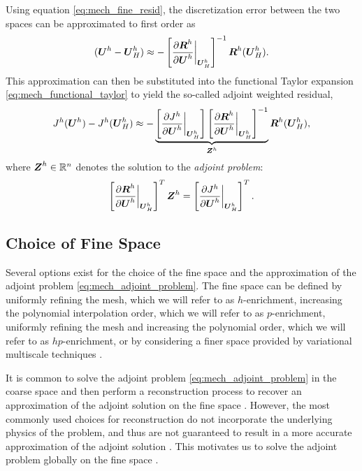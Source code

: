 Using equation \eqref{eq:mech_fine_resid}, the discretization error between
the two spaces can be approximated to first order as
%
\begin{gather}
(\boldsymbol{U}^h - \boldsymbol{U}^h_H) \approx
- \left[
\frac{ \partial \boldsymbol{R}^h } { \partial \boldsymbol{U}^h } \biggr|_{\boldsymbol{U}^h_H}
\right]^{-1}
\boldsymbol{R}^h (\boldsymbol{U}^h_H ).
\label{eq:mech_disc_error_approx}
\end{gather}
This approximation can then be substituted into the functional Taylor
expansion \eqref{eq:mech_functional_taylor} to yield the so-called
adjoint weighted residual,
%
\begin{gather}
J^h(\boldsymbol{U}^h) - J^h(\boldsymbol{U}^h_H) \approx
- 
\underbrace{
\left[
\frac{ \partial J^h } { \partial \boldsymbol{U}^h } \biggr|_{\boldsymbol{U}^h_H}
\right]
\left[
\frac{ \partial \boldsymbol{R}^h } { \partial \boldsymbol{U}^h } \biggr|_{\boldsymbol{U}^h_H}
\right]^{-1}
}_{\boldsymbol{Z}^h}
\boldsymbol{R}^h (\boldsymbol{U}^h_H),
\label{eq:mech_adjoint_weighted_residual}
\end{gather}
%
where $\boldsymbol{Z}^h \in \mathbb{R}^n$ denotes the solution to the
\emph{adjoint problem}:
%
\begin{gather}
\left[
\frac{ \partial \boldsymbol{R}^h } { \partial \boldsymbol{U}^h} \biggr|_{\boldsymbol{U}^h_H}
\right]^T
\boldsymbol{Z}^h =
\left[
\frac{ \partial J^h } { \partial \boldsymbol{U}^h } \biggr|_{\boldsymbol{U}^h_H}
\right]^T.
\label{eq:mech_adjoint_problem}
\end{gather}

\subsection{Choice of Fine Space}

Several options exist for the choice of the fine space and the
approximation of the adjoint problem \eqref{eq:mech_adjoint_problem}.
The fine space can be defined by uniformly refining the mesh, which
we will refer to as $h$-enrichment, increasing the polynomial interpolation
order, which we will refer to as $p$-enrichment, uniformly refining
the mesh and increasing the polynomial order, which we will refer to as
$hp$-enrichment, or by considering a finer space provided by variational
multiscale techniques \cite{granzow2017output}.

It is common to solve the adjoint problem
\eqref{eq:mech_adjoint_problem} in the coarse space and then perform
a reconstruction process to recover an approximation of the adjoint
solution on the fine space \cite{nemec2007adjoint, lu2005posteriori,
fidkowski2006output, becker2001optimal}. However, the most commonly used
choices for reconstruction do not incorporate the underlying physics of the
problem, and thus are not guaranteed to result in a more accurate
approximation of the adjoint solution \cite{fidkowski2011review}.
This motivates us to solve the adjoint problem globally on the fine space
\cite{barth2002aposteriori, hartmann2002adaptive}.

